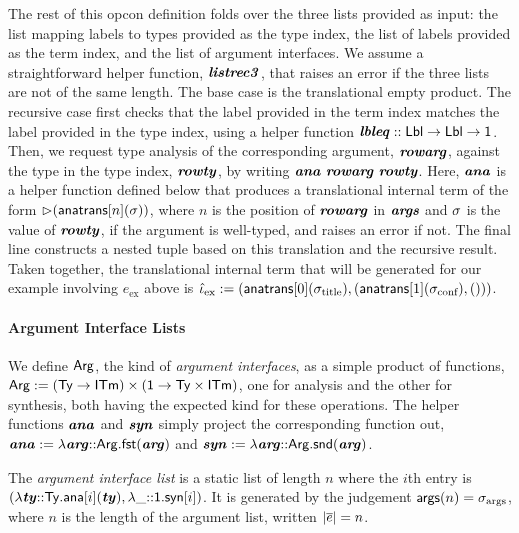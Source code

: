 \documentclass[10pt,preprint]{sigplanconf}
\begin{document}
The rest of this opcon definition folds over the three lists provided as input: the list mapping labels to types provided as the type index, the list of labels provided as the term index, and the list of argument interfaces. We assume a straightforward helper function, ${\textbf{\textit{listrec3}}}$, that raises an error if the three lists are not of the same length. The base case is the translational empty product. The recursive case first checks that the label provided in the term index matches the label provided in the type index, using a helper function ${\textbf{\textit{lbleq}}} :: {\sf Lbl} \rightarrow {\sf Lbl} \rightarrow {\sf 1}$. Then, we request type analysis of the corresponding argument, ${\textbf{\textit{rowarg}}}$,  against the type in the type index, ${\textbf{\textit{rowty}}}$, by writing ${\textbf{\textit{ana}}}~{\textbf{\textit{rowarg}}}~{\textbf{\textit{rowty}}}$. Here, ${\textbf{\textit{ana}}}$ is a helper function defined below that produces a translational internal term  of the form ${\rhd}({\sf anatrans}[n](\sigma))$, where $n$ is the position of ${\textbf{\textit{rowarg}}}$ in ${\textbf{\textit{args}}}$ and $\sigma$ is the value of ${\textbf{\textit{rowty}}}$, if the argument is well-typed, and raises an error if not. The final line constructs a nested tuple based on this translation and the recursive result. Taken together, the translational internal term that will be generated for our example involving $e_\text{ex}$ above is $\small\qitm_\text{ex} := (\anatrans{0}{\stx{title}}, (\anatrans{1}{\stx{conf}}, ()))$.

\paragraph{Argument Interface Lists} We define ${\sf Arg}$, the kind of \emph{argument interfaces}, as a simple product of functions, ${\sf Arg} := ({\sf Ty} \rightarrow {\sf ITm}) \times ({\sf 1} \rightarrow {\sf Ty}\times{\sf ITm})$, one for analysis and the other for synthesis, both having the expected kind for these operations. The helper functions ${\textbf{\textit{ana}}}$ and ${\textbf{\textit{syn}}}$ simply project the corresponding function out, ${\textbf{\textit{ana}}} := \lambda {\textbf{\textit{arg}}}{::}{\sf Arg}.{\sf fst}({\textbf{\textit{arg}}})$ and ${\textbf{\textit{syn}}}  :=  \lambda {\textbf{\textit{arg}}}{::}{\sf Arg}.{\sf snd}({\textbf{\textit{arg}}})$. 

The \emph{argument interface list} is a static list of length $n$ where the $i$th entry is $(\lambda {\textbf{\textit{ty}}}{::}{\sf Ty}.{\sf ana}[i]({\textbf{\textit{ty}}}), \lambda \_{::}{\sf 1}.{\sf syn}[i])$. It is generated by the judgement ${\sf args}(n)=\sigma_\text{args}$, where $n$ is the length of the argument list, written $|\overline{e}|=n$.



\end{document}

